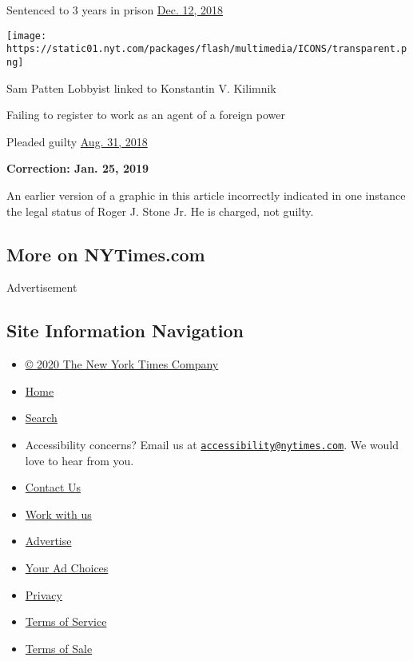 Sentenced to 3 years in prison
\href{https://www.nytimes.com/2018/12/12/nyregion/michael-cohen-sentence-trump.html}{Dec.
12, 2018}

\texttt{[image: https://static01.nyt.com/packages/flash/multimedia/ICONS/transparent.png]}

Sam Patten Lobbyist linked to Konstantin V. Kilimnik

Failing to register to work as an agent of a foreign power

Pleaded guilty
\href{https://www.nytimes.com/2018/08/31/us/politics/patten-fara-manafort.html}{Aug.
31, 2018}

\textbf{Correction: Jan. 25, 2019}

An earlier version of a graphic in this article incorrectly indicated in
one instance the legal status of Roger J. Stone Jr. He is charged, not
guilty.

\hypertarget{more-on-nytimescom}{%
\subsection{More on NYTimes.com}\label{more-on-nytimescom}}

Advertisement

\hypertarget{site-information-navigation}{%
\subsection{Site Information
Navigation}\label{site-information-navigation}}

\begin{itemize}
\tightlist
\item
  \href{https://help.nytimes.com/hc/en-us/articles/115014792127-Copyright-notice}{©
  2020 The New York Times Company}
\item
  \href{https://www.nytimes.com}{Home}
\item
  \href{https://www.nytimes.com/search/}{Search}
\item
  Accessibility concerns? Email us at
  \href{mailto:accessibility@nytimes.com}{\nolinkurl{accessibility@nytimes.com}}.
  We would love to hear from you.
\item
  \href{https://help.nytimes.com/hc/en-us/articles/115015385887-Contact-Us}{Contact
  Us}
\item
  \href{https://www.nytco.com/careers/}{Work with us}
\item
  \href{https://nytmediakit.com/}{Advertise}
\item
  \href{https://help.nytimes.com/hc/en-us/articles/115014892108-Privacy-policy\#pp}{Your
  Ad Choices}
\item
  \href{https://help.nytimes.com/hc/en-us/articles/115014892108-Privacy-policy}{Privacy}
\item
  \href{https://help.nytimes.com/hc/en-us/articles/115014893428-Terms-of-service}{Terms
  of Service}
\item
  \href{https://help.nytimes.com/hc/en-us/articles/115014893968-Terms-of-sale}{Terms
  of Sale}
\end{itemize}

